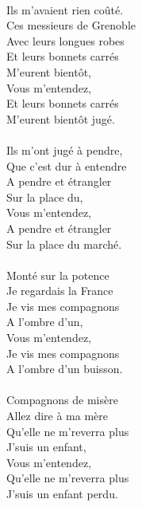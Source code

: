 {\\Ils m'avaient rien coûté.
\\Ces messieurs de Grenoble
\\Avec leurs longues robes
\\Et leurs bonnets carrés
\\M'eurent bientôt,
\\Vous m'entendez,
\\Et leurs bonnets carrés
\\M'eurent bientôt jugé.
\\\\Ils m'ont jugé à pendre,
\\Que c'est dur à entendre
\\A pendre et étrangler
\\Sur la place du,
\\Vous m'entendez,
\\A pendre et étrangler
\\Sur la place du marché.
\\\\Monté sur la potence
\\Je regardais la France
\\Je vis mes compagnons
\\A l'ombre d'un,
\\Vous m'entendez,
\\Je vis mes compagnons
\\A l'ombre d'un buisson.
\\\\Compagnons de misère
\\Allez dire à ma mère
\\Qu'elle ne m'reverra plus
\\J'suis un enfant,
\\Vous m'entendez,
\\Qu'elle ne m'reverra plus
\\J'suis un enfant perdu.}

\breakpage